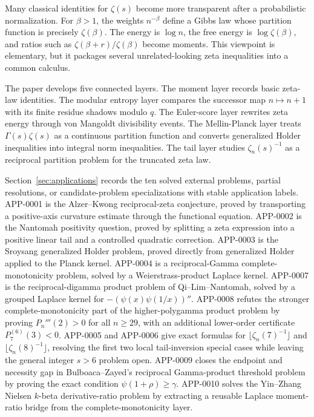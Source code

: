 \documentclass[11pt]{article}
\numberwithin{equation}{section}
\theoremstyle{definition}
\theoremstyle{remark}
\newcommand{\1}{\mathbf 1}
\begin{document}
Many classical identities for \(\zeta(s)\) become more transparent after a probabilistic normalization.  For \(\beta>1\), the weights \(n^{-\beta}\) define a Gibbs law whose partition function is precisely \(\zeta(\beta)\).  The energy is \(\log n\), the free energy is \(\log\zeta(\beta)\), and ratios such as \(\zeta(\beta+r)/\zeta(\beta)\) become moments.  This viewpoint is elementary, but it packages several unrelated-looking zeta inequalities into a common calculus.

The paper develops five connected layers.  The moment layer records basic zeta-law identities.  The modular entropy layer compares the successor map \(n\mapsto n+1\) with its finite residue shadows modulo \(q\).  The Euler-score layer rewrites zeta energy through von Mangoldt divisibility events.  The Mellin-Planck layer treats \(\Gamma(s)\zeta(s)\) as a continuous partition function and converts generalized Holder inequalities into integral norm inequalities.  The tail layer studies \(\zeta_n(s)^{-1}\) as a reciprocal partition problem for the truncated zeta law.

Section~\ref{sec:applications} records the ten solved external problems, partial resolutions, or candidate-problem specializations with stable application labels.  APP-0001 is the Alzer--Kwong reciprocal-zeta conjecture, proved by transporting a positive-axis curvature estimate through the functional equation.  APP-0002 is the Nantomah positivity question, proved by splitting a zeta expression into a positive linear tail and a controlled quadratic correction.  APP-0003 is the Sroysang generalized Holder problem, proved directly from generalized Holder applied to the Planck kernel.  APP-0004 is a reciprocal-Gamma complete-monotonicity problem, solved by a Weierstrass-product Laplace kernel.  APP-0007 is the reciprocal-digamma product problem of Qi--Lim--Nantomah, solved by a grouped Laplace kernel for \(-(\psi(x)\psi(1/x))''\).  APP-0008 refutes the stronger complete-monotonicity part of the higher-polygamma product problem by proving \(P_n'''(2)>0\) for all \(n\ge29\), with an additional lower-order certificate \(P_7^{(6)}(3)<0\).  APP-0005 and APP-0006 give exact formulas for \(\lfloor \zeta_n(7)^{-1}\rfloor\) and \(\lfloor \zeta_n(8)^{-1}\rfloor\), resolving the first two local tail-inversion special cases while leaving the general integer \(s>6\) problem open.  APP-0009 closes the endpoint and necessity gap in Bulboaca--Zayed's reciprocal Gamma-product threshold problem by proving the exact condition \(\psi(1+\rho)\ge\gamma\).  APP-0010 solves the Yin--Zhang Nielsen \(k\)-beta derivative-ratio problem by extracting a reusable Laplace moment-ratio bridge from the complete-monotonicity layer.
\end{document}
